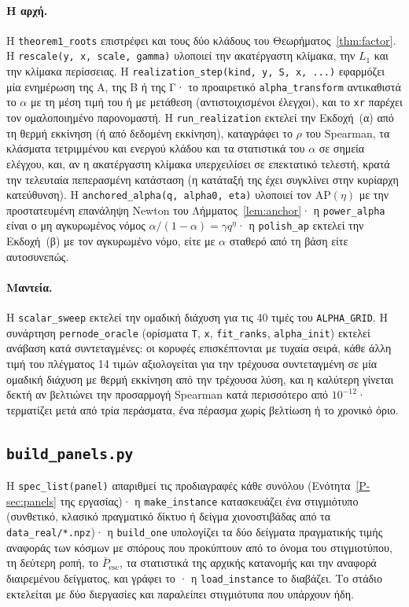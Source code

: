 \documentclass[11pt,a4paper]{article}
\theoremstyle{definition}
\theoremstyle{plain}
\newcommand{\Pescbar}{\bar{P}_{\mathrm{esc}}}
\newcommand{\AP}{\mathrm{AP}}
\newcommand{\file}[1]{\path{#1}}
\begin{document}
\paragraph{Η αρχή.} Η \texttt{theorem1\_roots} επιστρέφει και τους δύο κλάδους του Θεωρήματος~\ref{thm:factor}. Η \texttt{rescale(y, x, scale, gamma)} υλοποιεί την ακατέργαστη κλίμακα, την $L_1$ και την κλίμακα περίσσειας. Η \texttt{realization\_step(kind, y, S, x, ...)} εφαρμόζει μία ενημέρωση της Α, της Β ή της Γ· το προαιρετικό \texttt{alpha\_transform} αντικαθιστά το $\alpha$ με τη μέση τιμή του ή με μετάθεση (αντιστοιχισμένοι έλεγχοι), και το \texttt{xr} παρέχει τον ομαλοποιημένο παρονομαστή. Η \texttt{run\_realization} εκτελεί την Εκδοχή~(α) από τη θερμή εκκίνηση (ή από δεδομένη εκκίνηση), καταγράφει το $\rho$ του Spearman, τα κλάσματα τετριμμένου και ενεργού κλάδου και τα στατιστικά του $\alpha$ σε σημεία ελέγχου, και, αν η ακατέργαστη κλίμακα υπερχειλίσει σε επεκτατικό τελεστή, κρατά την τελευταία πεπερασμένη κατάσταση (η κατάταξή της έχει συγκλίνει στην κυρίαρχη κατεύθυνση). Η \texttt{anchored\_alpha(q, alpha0, eta)} υλοποιεί τον $\AP(\eta)$ με την προστατευμένη επανάληψη Newton του Λήμματος~\ref{lem:anchor}· η \texttt{power\_alpha} είναι ο μη αγκυρωμένος νόμος $\alpha/(1-\alpha)=\gamma q^\eta$· η \texttt{polish\_ap} εκτελεί την Εκδοχή~(β) με τον αγκυρωμένο νόμο, είτε με $\alpha$ σταθερό από τη βάση είτε αυτοσυνεπώς.

\paragraph{Μαντεία.} Η \texttt{scalar\_sweep} εκτελεί την ομαδική διάχυση για τις 40 τιμές του \texttt{ALPHA\_GRID}. Η συνάρτηση \texttt{pernode\_oracle} (ορίσματα \texttt{T}, \texttt{x}, \texttt{fit\_ranks}, \texttt{alpha\_init}) εκτελεί ανάβαση κατά συντεταγμένες: οι κορυφές επισκέπτονται με τυχαία σειρά, κάθε άλλη τιμή του πλέγματος 14 τιμών αξιολογείται για την τρέχουσα συντεταγμένη σε μία ομαδική διάχυση με θερμή εκκίνηση από την τρέχουσα λύση, και η καλύτερη γίνεται δεκτή αν βελτιώνει την προσαρμογή Spearman κατά περισσότερο από $10^{-12}$· τερματίζει μετά από τρία περάσματα, ένα πέρασμα χωρίς βελτίωση ή το χρονικό όριο.

\subsection{\texorpdfstring{\texttt{build\_panels.py}}{build\_panels.py}}

Η \texttt{spec\_list(panel)} απαριθμεί τις προδιαγραφές κάθε συνόλου (Ενότητα~\ref*{P-sec:panels} της εργασίας)· η \texttt{make\_instance} κατασκευάζει ένα στιγμιότυπο (συνθετικό, κλασικό πραγματικό δίκτυο ή δείγμα χιονοστιβάδας από τα \texttt{data\_real/*.npz})· η \texttt{build\_one} υπολογίζει τα δύο δείγματα πραγματικής τιμής αναφοράς των \MGTsp{} κόσμων με σπόρους που προκύπτουν από το όνομα του στιγμιοτύπου, τη δεύτερη ροπή, το $\Pescbar$, τα στατιστικά της αρχικής κατανομής και την αναφορά διαιρεμένου δείγματος, και γράφει το \file{data/<panel>/NNNN.npz}· η \texttt{load\_instance} το διαβάζει. Το στάδιο εκτελείται με δύο διεργασίες και παραλείπει στιγμιότυπα που υπάρχουν ήδη.
\end{document}
